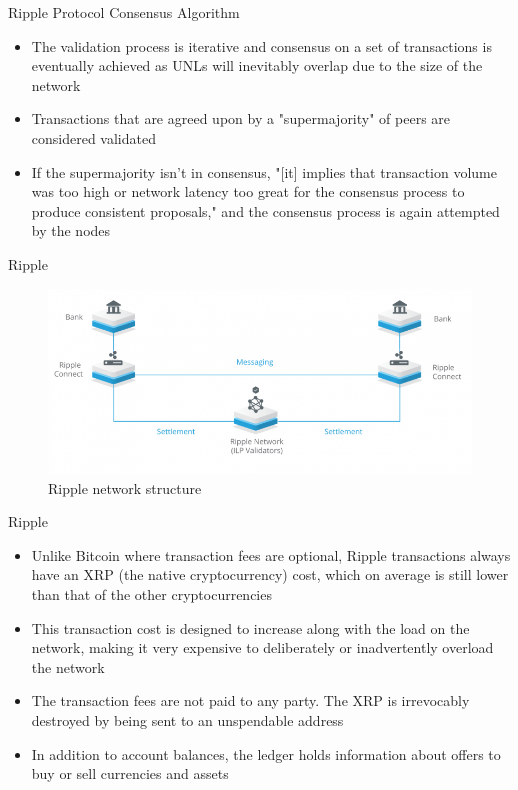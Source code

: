 \documentclass[11pt]{beamer}
\begin{document}

\begin{frame}{Ripple Protocol Consensus Algorithm}
	\begin{itemize}
		\item The validation process is iterative and consensus on a set of transactions is eventually achieved as UNLs will inevitably overlap due to the size of the network
		\item Transactions that are agreed upon by a "supermajority" of peers are considered validated
		\item If the supermajority isn't in consensus, "[it] implies that transaction volume was too high or network latency too great for the consensus process to produce consistent proposals," and the consensus process is again attempted by the nodes
	\end{itemize}
\end{frame}


\begin{frame}{Ripple}
	\begin{figure}[]
		\centering
		\includegraphics  [scale=0.3]{Images/ripple1}
		\caption{Ripple network structure}
	\end{figure}
\end{frame}


\begin{frame}{Ripple}
	\begin{itemize}
		\item Unlike Bitcoin where transaction fees are optional, Ripple transactions always have an XRP (the native cryptocurrency) cost, which on average is still lower than that of the other cryptocurrencies
		\item This transaction cost is designed to increase along with the load on the network, making it very expensive to deliberately or inadvertently overload the network
		\item The transaction fees are not paid to any party. The XRP is irrevocably destroyed by being sent to an unspendable address
		\item In addition to account balances, the ledger holds information about offers to buy or sell currencies and assets
	\end{itemize}
\end{frame}
\end{document}
